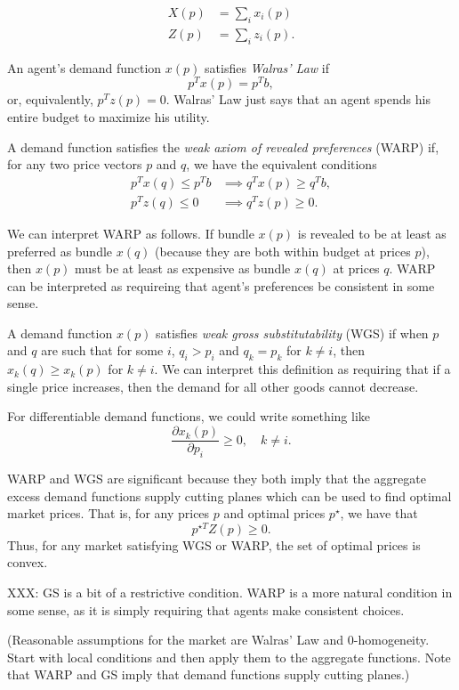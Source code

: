 \documentclass[12pt]{article}
\begin{document}
\begin{align*}
X(p) &= \sum_i x_i(p)\\
Z(p) &= \sum_i z_i(p).
\end{align*}

An agent's demand function $x(p)$ satisfies \emph{Walras' Law} if
\[
p^T x(p) = p^T b,
\]
or, equivalently, $p^T z(p) = 0$.
Walras' Law just says that an agent spends his entire budget to
maximize his utility.

A demand function satisfies the \emph{weak axiom of revealed preferences}
(WARP) if, for any two price vectors $p$ and $q$, we have the equivalent
conditions
\begin{align*}
p^T x(q) \leq p^T b &\implies q^T x(p) \geq q^T b,\\
p^T z(q) \leq 0 &\implies q^T z(p) \geq 0.
\end{align*}

We can interpret WARP as follows.
If bundle $x(p)$ is revealed to be at least as preferred as bundle
$x(q)$ (because they are both within budget at prices $p$), then
$x(p)$ must be at least as expensive as bundle $x(q)$ at prices $q$.
WARP can be interpreted as requireing that agent's preferences be
consistent in some sense.

A demand function $x(p)$ satisfies \emph{weak gross substitutability} (WGS)
if when $p$ and $q$ are such that for some $i$, $q_i > p_i$ and
$q_k = p_k$ for $k \neq i$, then $x_k(q) \geq x_k(p)$ for $k \neq i$.
We can interpret this definition as requiring that if a single price increases,
then the demand for all other goods cannot decrease.

For differentiable demand functions, we could write something like
\[
\frac{\partial x_k(p)}{\partial p_i} \geq 0,\quad k \neq i.
\]

WARP and WGS are significant because they both imply that
the aggregate excess demand functions supply cutting planes which can
be used to find optimal market prices.
That is, for any prices $p$ and optimal prices $p^\star$, we have that
\[
p^{\star T} Z(p) \geq 0.
\]
Thus, for any market satisfying WGS or WARP, the set of optimal prices
is convex.

XXX: GS is a bit of a restrictive condition. WARP is a more natural condition in some
sense, as it is simply requiring that agents make consistent choices.

(Reasonable assumptions for the market are Walras' Law and 0-homogeneity.
Start with local conditions and then apply them to the aggregate functions.
Note that WARP and GS imply that demand functions supply cutting planes.)
\end{document}
